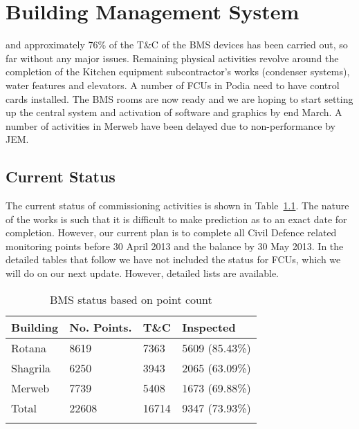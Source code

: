 \chapter{Building Management System}
\label{bms}

 and approximately 76\% of the T\&C of the \ac{BMS} devices has been carried out, so far without any major issues. Remaining physical activities revolve around the
completion of the Kitchen equipment subcontractor's works (condenser systems), water features and elevators. A number of \acp{FCU} in Podia need to have control cards installed. The BMS rooms are now ready and we are hoping to start setting up the central system and activation of software and graphics by end March. A number of activities in Merweb have been delayed due to non-performance by JEM.

\section{Current Status}

The current status of commissioning activities is shown in
Table~\ref{tbl:bmsstatus}. The nature of the works is such
that it is difficult to make prediction as to an exact date
for completion. However, our current plan is to complete all Civil Defence related monitoring points before 30 April 2013 and the balance by 30 May 2013. In the detailed tables that follow we have not included the status for FCUs, which we will do on our next update. However, detailed lists are available.


\begin{table}[htbp]
\begin{tabular}{llll}
\toprule
Building   &No. Points. &T\&C &Inspected\\
\midrule
Rotana     & 8619       &7363     & 5609 (85.43\%) \\
Shagrila   & 6250       &3943     & 2065 (63.09\%) \\
Merweb     & 7739       &5408     & 1673 (69.88\%) \\
\midrule
Total      &22608       &16714    &9347  (73.93\%) \\
\bottomrule 
\caption{BMS status based on point count}
\label{tbl:bmsstatus}
\end{tabular}
\end{table}

